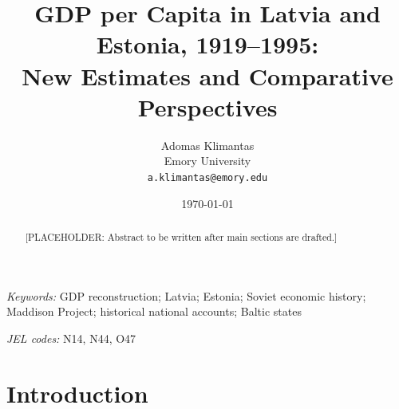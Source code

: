 \documentclass[12pt,a4paper]{article}
\begin{document}

\title{GDP per Capita in Latvia and Estonia, 1919--1995:\\ New Estimates and Comparative Perspectives}

\author{Adomas Klimantas\\
  \small Emory University\\
  \small \texttt{a.klimantas@emory.edu}
}

\date{\today}

\maketitle

\begin{abstract}
\noindent
[PLACEHOLDER: Abstract to be written after main sections are drafted.]
\end{abstract}

\bigskip
\noindent\textit{Keywords:} GDP reconstruction; Latvia; Estonia; Soviet economic history;
Maddison Project; historical national accounts; Baltic states

\bigskip
\noindent\textit{JEL codes:} N14, N44, O47

\clearpage

\section{Introduction}
\label{sec:introduction}
\end{document}
